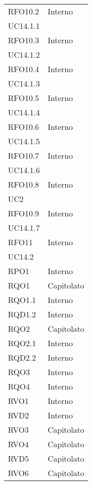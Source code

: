 \begin{longtable}{ >{\centering}p{}
		>{\centering}p{}}
RFO10.2	&	Interno \\UC14.1.1\tabularnewline
RFO10.3	&	Interno \\UC14.1.2\tabularnewline
RFO10.4	&	Interno \\UC14.1.3\tabularnewline
RFO10.5	&	Interno \\UC14.1.4\tabularnewline
RFO10.6	&	Interno \\UC14.1.5\tabularnewline
RFO10.7	&	Interno \\UC14.1.6\tabularnewline
RFO10.8	&	Interno \\ UC2 \tabularnewline
RFO10.9	&	Interno \\UC14.1.7 \tabularnewline
RFO11	&	Interno \\UC14.2 \tabularnewline
RPO1	&	Interno \tabularnewline
RQO1	&	Capitolato \tabularnewline
RQO1.1	&	Interno \tabularnewline
RQD1.2	&	Interno \tabularnewline
RQO2	&	Capitolato \tabularnewline
RQO2.1	&	Interno \tabularnewline
RQD2.2	&	Interno \tabularnewline
RQO3	&	Interno \tabularnewline
RQO4	&	Interno \tabularnewline
RVO1	&	Interno \tabularnewline
RVD2	&	Interno \tabularnewline
RVO3	&	Capitolato \tabularnewline
RVO4	&	Capitolato \tabularnewline
RVD5	&	Capitolato \tabularnewline
RVO6	&	Capitolato \tabularnewline
		
\end{longtable}



